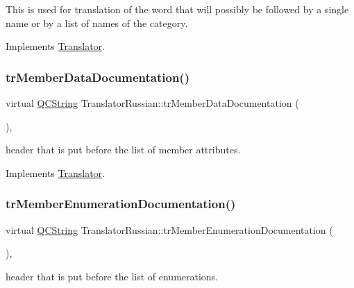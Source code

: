 This is used for translation of the word that will possibly be followed by a single name or by a list of names of the category. 

Implements \mbox{\hyperlink{class_translator}{Translator}}.

\mbox{\label{class_translator_russian_a941d6b754ec416212558df601895b8b3}} 
\subsubsection{\texorpdfstring{trMemberDataDocumentation()}{trMemberDataDocumentation()}}
{\footnotesize\ttfamily virtual \mbox{\hyperlink{class_q_c_string}{Q\+C\+String}} Translator\+Russian\+::tr\+Member\+Data\+Documentation (\begin{DoxyParamCaption}{ }\end{DoxyParamCaption})\hspace{0.3cm}{\ttfamily [inline]}, {\ttfamily [virtual]}}

header that is put before the list of member attributes. 

Implements \mbox{\hyperlink{class_translator}{Translator}}.

\mbox{\label{class_translator_russian_ac83db6c213fe59dacfc401f6ae1ac800}} 
\subsubsection{\texorpdfstring{trMemberEnumerationDocumentation()}{trMemberEnumerationDocumentation()}}
{\footnotesize\ttfamily virtual \mbox{\hyperlink{class_q_c_string}{Q\+C\+String}} Translator\+Russian\+::tr\+Member\+Enumeration\+Documentation (\begin{DoxyParamCaption}{ }\end{DoxyParamCaption})\hspace{0.3cm}{\ttfamily [inline]}, {\ttfamily [virtual]}}

header that is put before the list of enumerations. 

